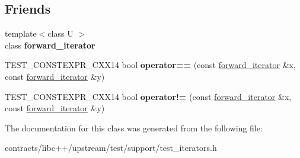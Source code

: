 \subsection*{Friends}
\begin{DoxyCompactItemize}
\item 
\mbox{\label{classforward__iterator_ad408782e21285fc911c8030273b9d176}} 
{\footnotesize template$<$class U $>$ }\\class {\bfseries forward\+\_\+iterator}
\item 
\mbox{\label{classforward__iterator_a8c751fa69305aeec994fe55879d5c2dc}} 
T\+E\+S\+T\+\_\+\+C\+O\+N\+S\+T\+E\+X\+P\+R\+\_\+\+C\+X\+X14 bool {\bfseries operator==} (const \mbox{\hyperlink{classforward__iterator}{forward\+\_\+iterator}} \&x, const \mbox{\hyperlink{classforward__iterator}{forward\+\_\+iterator}} \&y)
\item 
\mbox{\label{classforward__iterator_afaf87cf408c3d91c4201b10d12bb24a8}} 
T\+E\+S\+T\+\_\+\+C\+O\+N\+S\+T\+E\+X\+P\+R\+\_\+\+C\+X\+X14 bool {\bfseries operator!=} (const \mbox{\hyperlink{classforward__iterator}{forward\+\_\+iterator}} \&x, const \mbox{\hyperlink{classforward__iterator}{forward\+\_\+iterator}} \&y)
\end{DoxyCompactItemize}


The documentation for this class was generated from the following file\+:\begin{DoxyCompactItemize}
\item 
contracts/libc++/upstream/test/support/test\+\_\+iterators.\+h\end{DoxyCompactItemize}
